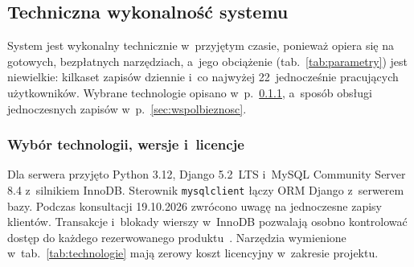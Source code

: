 \documentclass[12pt,a4paper,oneside]{article}
\begin{document}
\subsection{Techniczna wykonalność systemu}
\label{sec:wykonalnosc}

System jest wykonalny technicznie w~przyjętym czasie, ponieważ opiera się na gotowych, bezpłatnych narzędziach, a~jego obciążenie (tab.~\ref{tab:parametry}) jest niewielkie: kilkaset zapisów dziennie i~co najwyżej 22~jednocześnie pracujących użytkowników. Wybrane technologie opisano w~p.~\ref{sec:technologie}, a~sposób obsługi jednoczesnych zapisów w~p.~\ref{sec:wspolbieznosc}.

\subsubsection{Wybór technologii, wersje i~licencje}
\label{sec:technologie}

Dla serwera przyjęto Python 3.12, Django 5.2~LTS i~MySQL Community Server 8.4 z~silnikiem InnoDB. Sterownik \texttt{mysqlclient} łączy ORM Django z~serwerem bazy. Podczas konsultacji 19.10.2026 zwrócono uwagę na jednoczesne zapisy klientów. Transakcje i~blokady wierszy w~InnoDB pozwalają osobno kontrolować dostęp do każdego rezerwowanego produktu~\cite{mysql-blokady}. Narzędzia wymienione w~tab.~\ref{tab:technologie} mają zerowy koszt licencyjny w~zakresie projektu.
\end{document}
